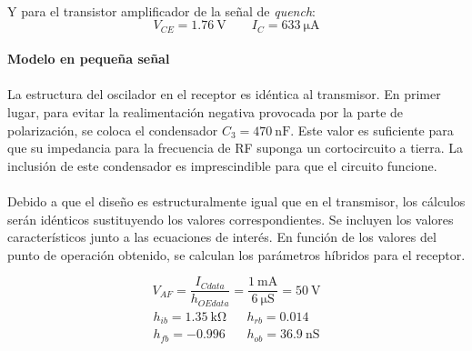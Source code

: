 \paragraph{}
Y para el transistor amplificador de la señal de \textit{quench}:
\begin{equation}
   V_{CE} = \SI{1.76}{\volt} \quad \quad I_C = \SI{633}{\micro\ampere}
\end{equation}

\paragraph{Modelo en pequeña señal}
\paragraph{}
La estructura del oscilador en el receptor es idéntica al transmisor. 
En primer lugar, para evitar la realimentación negativa provocada por la parte de polarización, se coloca el condensador $C_3 = \SI{470}{\nano\farad}$. Este valor es suficiente para que su impedancia para la frecuencia de RF suponga un cortocircuito a tierra. La inclusión de este condensador es imprescindible para que el circuito funcione. 
\paragraph{} 
Debido a que el diseño es estructuralmente igual que en el transmisor, los cálculos serán idénticos sustituyendo los valores correspondientes.
Se incluyen los valores característicos junto a las ecuaciones de interés.
En función de los valores del punto de operación obtenido, se calculan los parámetros híbridos para el receptor.

\begin{equation}
   \label{eq:result_pol1}
V_{AF} = \frac{I_{Cdata}}{h_{OEdata}} =\frac{\SI{1}{\milli\ampere}}{\SI{6}{\micro\siemens}} =  \SI{50}{\volt} 
\end{equation}
\begin{equation}
   \label{eq:result_pol2}
\begin{array}{rl} 
      \begin{array}{l}
	 h_{ib} =  \SI{1.35}{\kilo\ohm} \\
	 h_{fb} =  -0.996
      \end{array}
      &
      \begin{array}{l}
	 h_{rb} =  0.014 \\
	 h_{ob} =  \SI{36.9}{\nano\siemens}
      \end{array}
\end{array}
\end{equation}

